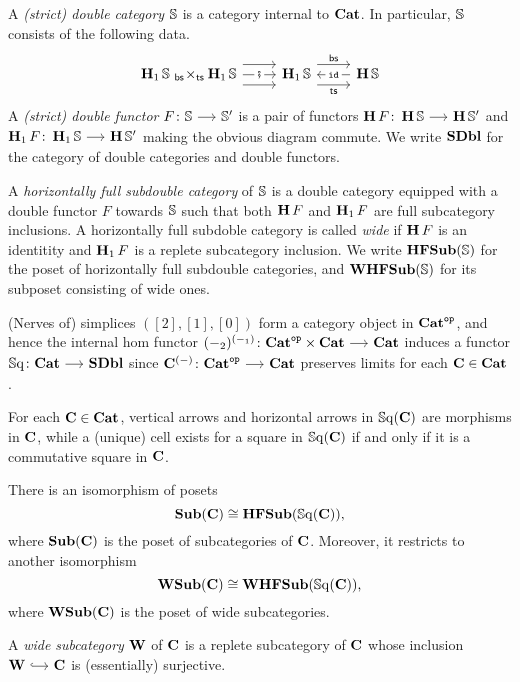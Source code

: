 \documentclass[a4paper,dvipsnames, 11pt]{amsart} %
\begin{document}
\begin{definition}
	A \emph{(strict) double category} $\mathbb{S}$ is a category internal to ${\mathbf{Cat}}$.
	In particular, $\mathbb{S}$ consists of the following data.
	\[
		\begin{tikzcd}
			\HcatC\dS
			\fibtimes{\bs}{\ts}
			\HcatC\dS
			\ar[r,shift left=3]
			\ar[r,"\fatsemi"description]
			\ar[r,shift right=3]
				&
				\HcatC\dS
				\ar[r,shift left=3,"\bs"]
				\ar[r,shift right=3,"\ts"']
					&
					\Hcat\dS
					\ar[l,"\id"description]
		\end{tikzcd}
	\]
	A \emph{(strict) double functor} $F\colon \dS\arr \dS'$ is a pair of functors
	$\Hcat F\colon\Hcat\dS\arr\Hcat\dS'$ and $\HcatC F\colon\HcatC\dS\arr\Hcat\dS'$ making the obvious diagram commute.
	We write $\mathbf{SDbl}$ for the category of double categories and double functors.

	A \emph{horizontally full subdouble category} of $\mathbb{S}$ is a double category equipped with a double functor $F$ towards $\mathbb{S}$
	such that both $\operatorname{\mathbf{H}} F$ and $\operatorname{\mathbf{H}_1} F$ are full subcategory inclusions.
	A horizontally full subdoble category is called \emph{wide} if $\operatorname{\mathbf{H}} F$ is an identitity and
	$\operatorname{\mathbf{H}_1} F$ is a replete subcategory inclusion.
	We write $\operatorname{\mathbf{HFSub}}(\mathbb{S})$ for the poset of horizontally full subdouble categories, and $\operatorname{\mathbf{WHFSub}}(\mathbb{S})$ for its subposet consisting of wide ones.
\end{definition}
\begin{example}
	(Nerves of) simplices $([2],[1],[0])$ form a category object in ${\mathbf{Cat}}^{\mathtt{op}}$,
	and hence the internal hom functor $(-_2)^{(-_1)}\colon\Catone^\op\times\Catone\arr\Catone$ induces a functor
	$\Sq\colon\Catone\arr\SDbl$ since $\one{C}^{(-)}\colon\Catone^\op\arr\Catone$ preserves limits for each $\mathbf{C}\in{\mathbf{Cat}}$.

	For each $\mathbf{C}\in{\mathbf{Cat}}$, vertical arrows and horizontal arrows
	in $\operatorname{\mathbb{S}\mathrm{q}}(\mathbf{C})$ are morphisms in $\mathbf{C}$, while a (unique) cell exists for a square in $\operatorname{\mathbb{S}\mathrm{q}}(\mathbf{C})$
	if and only if it is a commutative square in $\mathbf{C}$.
\end{example}
\begin{proposition}
	There is an isomorphism of posets
	\[
		\operatorname{\mathbf{Sub}}(\mathbf{C})\cong\operatorname{\mathbf{HFSub}}(\operatorname{\mathbb{S}\mathrm{q}}(\mathbf{C}))
		\text{,}
	\]
	where $\operatorname{\mathbf{Sub}}(\mathbf{C})$ is the poset of subcategories of $\mathbf{C}$.
	Moreover, it restricts to another isomorphism
	\[
		\operatorname{\mathbf{WSub}}(\mathbf{C})\cong\operatorname{\mathbf{WHFSub}}(\operatorname{\mathbb{S}\mathrm{q}}(\mathbf{C}))
		\text{,}
	\]
	where $\operatorname{\mathbf{WSub}}(\mathbf{C})$ is the poset of wide subcategories.
\end{proposition}
\begin{definition}
	A \emph{wide subcategory} $\mathbf{W}$ of $\mathbf{C}$ is a replete subcategory of $\mathbf{C}$ whose inclusion $\one{W}\arr[hook]\one{C}$
	is (essentially) surjective.
\end{definition}


\end{document}
